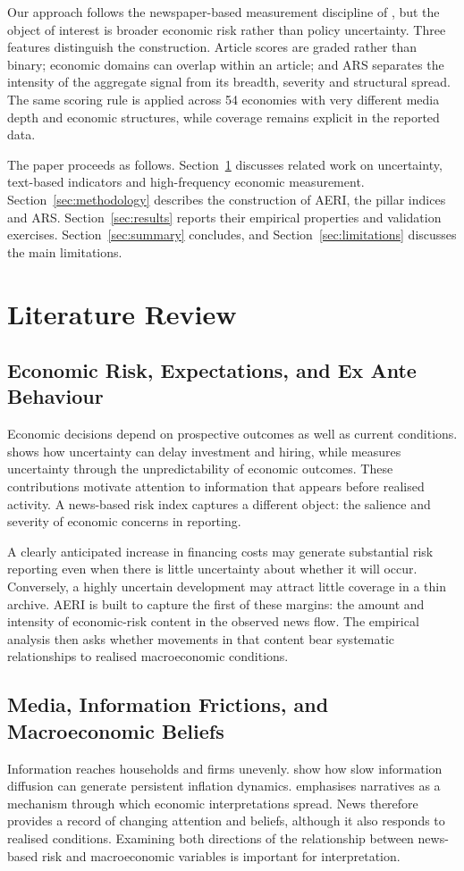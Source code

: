 \documentclass[12pt]{article}
\begin{document}
Our approach follows the newspaper-based measurement discipline of \citet{baker2016}, but the object of interest is broader economic risk rather than policy uncertainty. Three features distinguish the construction. Article scores are graded rather than binary; economic domains can overlap within an article; and ARS separates the intensity of the aggregate signal from its breadth, severity and structural spread. The same scoring rule is applied across 54 economies with very different media depth and economic structures, while coverage remains explicit in the reported data.

The paper proceeds as follows. Section~\ref{sec:literature} discusses related work on uncertainty, text-based indicators and high-frequency economic measurement. Section~\ref{sec:methodology} describes the construction of AERI, the pillar indices and ARS. Section~\ref{sec:results} reports their empirical properties and validation exercises. Section~\ref{sec:summary} concludes, and Section~\ref{sec:limitations} discusses the main limitations.

\section{Literature Review}\label{sec:literature}
\subsection{Economic Risk, Expectations, and Ex Ante Behaviour}
Economic decisions depend on prospective outcomes as well as current conditions. \citet{bloom2009} shows how uncertainty can delay investment and hiring, while \citet{jurado2015} measures uncertainty through the unpredictability of economic outcomes. These contributions motivate attention to information that appears before realised activity. A news-based risk index captures a different object: the salience and severity of economic concerns in reporting.

A clearly anticipated increase in financing costs may generate substantial risk reporting even when there is little uncertainty about whether it will occur. Conversely, a highly uncertain development may attract little coverage in a thin archive. AERI is built to capture the first of these margins: the amount and intensity of economic-risk content in the observed news flow. The empirical analysis then asks whether movements in that content bear systematic relationships to realised macroeconomic conditions.
\subsection{Media, Information Frictions, and Macroeconomic Beliefs}
Information reaches households and firms unevenly. \citet{mankiwreis2002} show how slow information diffusion can generate persistent inflation dynamics. \citet{shiller2017} emphasises narratives as a mechanism through which economic interpretations spread. News therefore provides a record of changing attention and beliefs, although it also responds to realised conditions. Examining both directions of the relationship between news-based risk and macroeconomic variables is important for interpretation.
\end{document}

